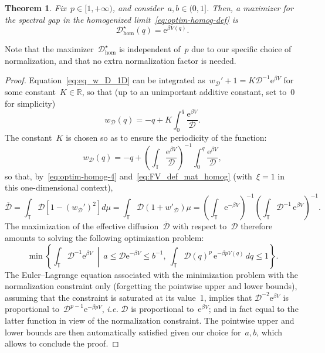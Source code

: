\documentclass{article}
\newtheorem{theorem}{Theorem}
\newcommand{\rme}{\mathrm{e}}
\newcommand{\R}{\mathbb{R}}
\renewcommand{\leq}{\leqslant}
\def\R{\mathbb{R}}
\def\T{\mathbb{T}}
\newcommand{\Diff}{\mathcal{D}}
\begin{document}
\begin{theorem}
  \label{thm:max-homog}
  Fix~$p \in [1,+\infty)$, and consider~$a,b \in (0,1]$. Then, a maximizer for the spectral gap in the homogenized limit~\eqref{eq:optim-homog-def} is
  \[
  \Diff^\star_{\mathrm{hom}}(q) = \rme^{\beta V(q)}.
  \]
\end{theorem}

Note that the maximizer~$\Diff^\star_{\mathrm{hom}}$ is independent of~$p$ due to our specific choice of normalization, and that no extra normalization factor is needed. 

\begin{proof}
  Equation~\eqref{eq:eq_w_D_1D} can be integrated as~$w_{\Diff}' + 1 = K \Diff^{-1} \rme^{\beta V}$ for some constant~$K \in \R$, so that (up to an unimportant additive constant, set to~0 for simplicity)
\[
w_{\Diff}(q) = -q + K \int_0^q \frac{\rme^{\beta V}}{\Diff}.
\]
The constant~$K$ is chosen so as to ensure the periodicity of the function:
\[
w_{\Diff}(q) = -q +  \left(\int_{\T} \frac{\rme^{\beta V}}{\Diff} \right)^{-1} \int_0^q \frac{\rme^{\beta V}}{\Diff}, %
\]
so that, by~\eqref{eq:optim-homog-4} and~\eqref{eq:FV_def_mat_homog} (with~$\xi=1$ in this one-dimensional context),
\[
\overline{\Diff} = \int_{\T}  \Diff \left[ 1 - \left(w_{\Diff}'\right)^2 \right] d\mu = \int_\T \Diff\left(1 + w'_{\Diff}\right) \mu = \left(\int_\T \rme^{-\beta V}\right)^{-1}\left(\int_\T \Diff^{-1} \, \rme^{\beta V}\right)^{-1}.
\]
The maximization of the effective diffusion~$\overline{\Diff}$ with respect to~$\Diff$ therefore amounts to solving the following optimization problem:
\[
\min\left\{ \int_{\T} \Diff^{-1} \rme^{\beta V} \ \middle| \ a \leq \Diff \rme^{-\beta V} \leq b^{-1}, \ \int_{\T} \Diff(q)^p \, \rme^{-\beta p V(q)} \, dq \leq 1 \right\}. 
\]
The Euler--Lagrange equation associated with the minimization problem with the normalization constraint only (forgetting the pointwise upper and lower bounds), assuming that the constraint is saturated at its value~1, implies that $\Diff^{-2} \rme^{\beta V}$ is proportional to~$\Diff^{p-1} \rme^{-\beta p V}$, \emph{i.e.} $\Diff$ is proportional to~$\rme^{\beta V}$; and in fact equal to the latter function in view of the normalization constraint. The pointwise upper and lower bounds are then automatically satisfied given our choice for~$a,b$, which allows to conclude the proof.
\end{proof}
\end{document}
